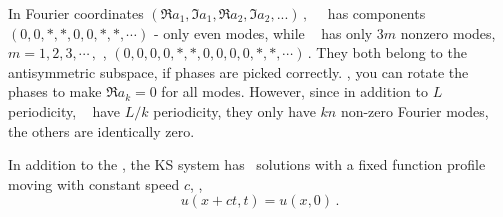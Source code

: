 In Fourier coordinates
\(
(\Re a_1, \Im a_1, \Re a_2, \Im a_2, ...)
\,,
\)
 ~\eqv\ has components \(
(0, 0, *, *, 0, 0, *, *,\cdots)
\) - only even modes, while ~{\eqv}
has only $3m$ nonzero modes,
\(
m = 1, 2, 3, \cdots\,,
\)
\ie,
\(
(0,0,0,0,*,*,0,0,0,0,*,*,\cdots)
\,.
\)
They both belong to the antisymmetric subspace, if phases are picked
correctly.
\ie,
you can rotate the phases to make
\( \Re a_k = 0 \)
for all modes. However,
since in addition to
$L$ periodicity, ~{\eqva} have
$L/k$ periodicity, they only have
$kn$ non-zero Fourier modes, the others are identically zero.


In addition to the \eqva, the KS system has \reqv\ solutions 
 with a fixed function profile
moving with constant speed $c$, \ie,
\[ u(x+ct,t) = u(x, 0)\,.
\]

